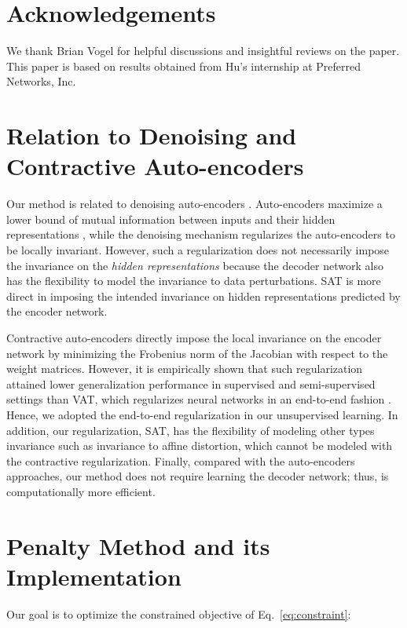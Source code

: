 \documentclass{article}
\theoremstyle{plain}
\begin{document}
\section*{Acknowledgements} 
We thank Brian Vogel for helpful discussions and insightful reviews on the paper. This paper is based on results obtained from Hu's internship at Preferred Networks, Inc.

\nocite{langley00}




\clearpage
\onecolumn
\appendix
\section{Relation to Denoising and Contractive Auto-encoders} \label{app:dae}
Our method is related to denoising auto-encoders \citep{vincent2008extracting}. Auto-encoders maximize a lower bound of mutual information \citep{cover2012elements} between inputs and their hidden representations \citep{vincent2008extracting}, while the denoising mechanism regularizes the auto-encoders to be locally invariant. However, such a regularization does not necessarily impose the invariance on the \emph{hidden representations} because the decoder network also has the flexibility to model the invariance to data perturbations. SAT is more direct in imposing the intended invariance on hidden representations predicted by the encoder network.

Contractive auto-encoders \citep{rifai2011contractive} directly impose the local invariance on the encoder network by minimizing the Frobenius norm of the Jacobian with respect to the weight matrices. However, it is empirically shown that such regularization attained lower generalization performance in supervised and semi-supervised settings than VAT, which regularizes neural networks in an end-to-end fashion \citep{miyato2015distributional}. Hence, we adopted the end-to-end regularization in our unsupervised learning. In addition, our regularization, SAT, has the flexibility of modeling other types invariance such as invariance to affine distortion, which cannot be modeled with the contractive regularization. Finally, compared with the auto-encoders approaches, our method does not require learning the decoder network; thus, is computationally more efficient.  

\section{Penalty Method and its Implementation} \label{app:penalty}
Our goal is to optimize the constrained objective of Eq.~\eqref{eq:constraint}:
\end{document}
